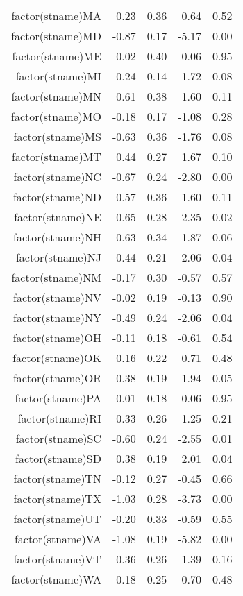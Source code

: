 \begin{table}[ht]
\begin{tabular}{rrrrr}
  factor(stname)MA & 0.23 & 0.36 & 0.64 & 0.52 \\ 
  factor(stname)MD & -0.87 & 0.17 & -5.17 & 0.00 \\ 
  factor(stname)ME & 0.02 & 0.40 & 0.06 & 0.95 \\ 
  factor(stname)MI & -0.24 & 0.14 & -1.72 & 0.08 \\ 
  factor(stname)MN & 0.61 & 0.38 & 1.60 & 0.11 \\ 
  factor(stname)MO & -0.18 & 0.17 & -1.08 & 0.28 \\ 
  factor(stname)MS & -0.63 & 0.36 & -1.76 & 0.08 \\ 
  factor(stname)MT & 0.44 & 0.27 & 1.67 & 0.10 \\ 
  factor(stname)NC & -0.67 & 0.24 & -2.80 & 0.00 \\ 
  factor(stname)ND & 0.57 & 0.36 & 1.60 & 0.11 \\ 
  factor(stname)NE & 0.65 & 0.28 & 2.35 & 0.02 \\ 
  factor(stname)NH & -0.63 & 0.34 & -1.87 & 0.06 \\ 
  factor(stname)NJ & -0.44 & 0.21 & -2.06 & 0.04 \\ 
  factor(stname)NM & -0.17 & 0.30 & -0.57 & 0.57 \\ 
  factor(stname)NV & -0.02 & 0.19 & -0.13 & 0.90 \\ 
  factor(stname)NY & -0.49 & 0.24 & -2.06 & 0.04 \\ 
  factor(stname)OH & -0.11 & 0.18 & -0.61 & 0.54 \\ 
  factor(stname)OK & 0.16 & 0.22 & 0.71 & 0.48 \\ 
  factor(stname)OR & 0.38 & 0.19 & 1.94 & 0.05 \\ 
  factor(stname)PA & 0.01 & 0.18 & 0.06 & 0.95 \\ 
  factor(stname)RI & 0.33 & 0.26 & 1.25 & 0.21 \\ 
  factor(stname)SC & -0.60 & 0.24 & -2.55 & 0.01 \\ 
  factor(stname)SD & 0.38 & 0.19 & 2.01 & 0.04 \\ 
  factor(stname)TN & -0.12 & 0.27 & -0.45 & 0.66 \\ 
  factor(stname)TX & -1.03 & 0.28 & -3.73 & 0.00 \\ 
  factor(stname)UT & -0.20 & 0.33 & -0.59 & 0.55 \\ 
  factor(stname)VA & -1.08 & 0.19 & -5.82 & 0.00 \\ 
  factor(stname)VT & 0.36 & 0.26 & 1.39 & 0.16 \\ 
  factor(stname)WA & 0.18 & 0.25 & 0.70 & 0.48 \\ 

\end{tabular}
\end{table}
